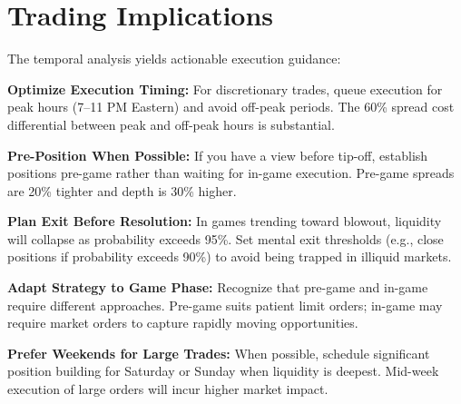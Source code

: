 \section{Trading Implications}

The temporal analysis yields actionable execution guidance:

\textbf{Optimize Execution Timing:} For discretionary trades, queue execution for peak hours (7--11 PM Eastern) and avoid off-peak periods. The 60\% spread cost differential between peak and off-peak hours is substantial.

\textbf{Pre-Position When Possible:} If you have a view before tip-off, establish positions pre-game rather than waiting for in-game execution. Pre-game spreads are 20\% tighter and depth is 30\% higher.

\textbf{Plan Exit Before Resolution:} In games trending toward blowout, liquidity will collapse as probability exceeds 95\%. Set mental exit thresholds (e.g., close positions if probability exceeds 90\%) to avoid being trapped in illiquid markets.

\textbf{Adapt Strategy to Game Phase:} Recognize that pre-game and in-game require different approaches. Pre-game suits patient limit orders; in-game may require market orders to capture rapidly moving opportunities.

\textbf{Prefer Weekends for Large Trades:} When possible, schedule significant position building for Saturday or Sunday when liquidity is deepest. Mid-week execution of large orders will incur higher market impact.

